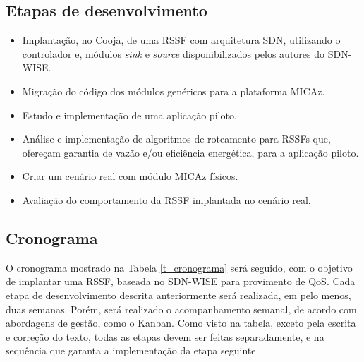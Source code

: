 \subsection{Etapas de desenvolvimento}
\begin{itemize}  
    \item Implantação, no Cooja, de uma \ac{RSSF} com arquitetura \ac{SDN}, utilizando o controlador e, módulos \textit{sink} e \textit{source} disponibilizados pelos autores do \ac{SDN-WISE}.
    \item Migração do código dos módulos genéricos para a plataforma MICAz.
    \item Estudo e implementação de uma aplicação piloto.
    \item Análise e implementação de algoritmos de roteamento para \ac{RSSF}s que, ofereçam garantia de vazão e/ou eficiência energética, para a aplicação piloto.
    \item Criar um cenário real com módulo MICAz físicos.
    \item Avaliação do comportamento da \ac{RSSF} implantada no cenário real. 
\end{itemize}

\subsection{Cronograma}

O cronograma mostrado na Tabela \ref{t_cronograma} será seguido, com o objetivo de implantar uma \ac{RSSF}, baseada no \ac{SDN-WISE} para provimento de \ac{QoS}. Cada etapa de desenvolvimento descrita anteriormente será realizada, em pelo menos, duas semanas. Porém, será realizado o acompanhamento semanal, de acordo com abordagens de gestão, como o Kanban. Como visto na tabela, exceto pela escrita e correção do texto, todas as etapas devem ser feitas separadamente, e na sequência que garanta a implementação da etapa seguinte.


